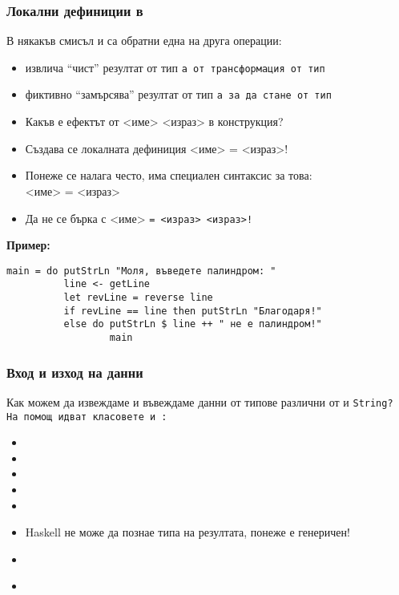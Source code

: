 \documentclass[alsotrans]{beamerswitch}
\begin{document}
\begin{frame}
  \frametitle{Локални дефиниции в }
  \small
  В някакъв смисъл \lst{<-} и  са обратни една на друга операции:
  \begin{itemize}[<+->]
  \item \lst{<-} извлича ``чист'' резултат от тип \tt{a} от трансформация от тип 
  \item {} фиктивно ``замърсява'' резултат от тип \tt{a} за да стане от тип 
  \item Какъв е ефектът от <име>  <израз> в  конструкция?
  \item Създава се локалната дефиниция <име> = <израз>!
  \item Понеже се налага често, има специален синтаксис за това:\\
     <име> \tta= <израз>
  \item Да не се бърка с  <име> \tt= <израз>  <израз>!
  \end{itemize}
  \onslide<+->
  \textbf{Пример:}
  \vspace{-.5ex}
\begin{lstlisting}
main = do putStrLn "Моля, въведете палиндром: "
          line <- getLine
          let revLine = reverse line
          if revLine == line then putStrLn "Благодаря!"
          else do putStrLn $ line ++ " не е палиндром!"
                  main
\end{lstlisting}
\end{frame}

\begin{frame}
  \frametitle{Вход и изход на данни}

  Как можем да извеждаме и въвеждаме данни от типове различни от  и \tt{String}?\\[1em]
  \pause
  На помощ идват класовете  и :
  \begin{itemize}[<+->]
  \item {}
  \item {}
  \item {}
  \item {}
  \item {}
  \item Haskell не може да познае типа на резултата, понеже е генеричен!
  \item {}
  \item {}\\
    \hspace{15ex}
  \end{itemize}
\end{frame}
\end{document}
